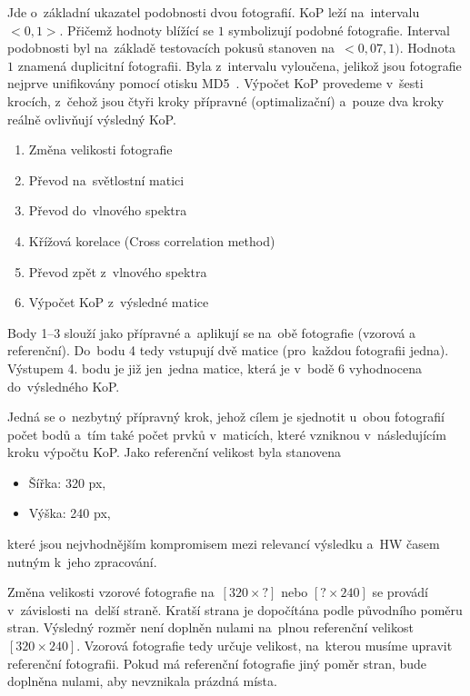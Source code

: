 Jde o~základní ukazatel podobnosti dvou fotografií. KoP leží na~intervalu $ <0,1> $. Přičemž hodnoty blížící se $ 1 $ symbolizují podobné fotografie. Interval podobnosti byl na~základě testovacích pokusů stanoven na~$ <0,07, 1) $. Hodnota $ 1 $ znamená duplicitní fotografii. Byla z~intervalu vyloučena, jelikož jsou fotografie nejprve unifikovány pomocí otisku MD5~\cite{md5}.
Výpočet KoP provedeme v~šesti krocích, z~čehož jsou čtyři kroky přípravné (optimalizační) a~pouze dva kroky reálně ovlivňují výsledný KoP.
\begin{enumerate}
	\setlength{\parskip}{0pt}
	\setlength{\itemsep}{0pt}
	\item {Změna velikosti fotografie}
	\item {Převod na~světlostní matici}
	\item {Převod do~vlnového spektra}
	\item {Křížová korelace (Cross correlation method)}
	\item {Převod zpět z~vlnového spektra}
	\item {Výpočet KoP z~výsledné matice}
\end{enumerate}
Body 1--3 slouží jako přípravné a~aplikují se na~obě fotografie (vzorová a referenční). Do~bodu 4 tedy vstupují dvě matice (pro~každou fotografii jedna). Výstupem 4. bodu je již jen~jedna matice, která je v~bodě 6 vyhodnocena do~výsledného KoP.

Jedná se o~nezbytný přípravný krok, jehož cílem je sjednotit u~obou fotografií počet bodů a~tím také počet prvků v~maticích, které vzniknou v~následujícím kroku výpočtu KoP.
Jako referenční velikost byla stanovena
\begin{itemize}
	\setlength{\parskip}{0pt}
	\setlength{\itemsep}{0pt}
	\item Šířka: 320 px,
	\item Výška: 240 px,
\end{itemize}
které jsou nejvhodnějším kompromisem mezi relevancí výsledku a~HW časem nutným k~jeho zpracování.

Změna velikosti vzorové fotografie na~$ [320 × ?] $ nebo $ [? × 240] $ se provádí v~závislosti na~delší straně. Kratší strana je dopočítána podle původního poměru stran. Výsledný rozměr není doplněn nulami na~plnou referenční velikost $ [320 × 240] $. Vzorová fotografie tedy určuje velikost, na~kterou musíme upravit referenční fotografii. Pokud má referenční fotografie jiný poměr stran, bude doplněna nulami, aby nevznikala prázdná místa.

